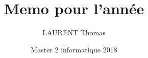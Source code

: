 \documentclass[french, 12pt]{report}
\title{Memo pour l'année}
\author{LAURENT Thomas}
\date{Master 2 informatique 2018}
\begin{document}
\maketitle
\pagebreak
\tableofcontents

\begin{titlepage}
\end{titlepage}
\pagebreak







\end{document}
